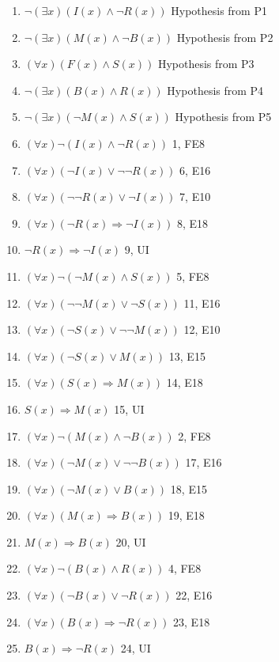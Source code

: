 \documentclass{article}
\begin{document}
		\begin{enumerate}
			\item $\lnot(\exists x)(I(x) \land \lnot R(x))$ \hfill Hypothesis from P1
			\item $\lnot(\exists x)(M(x) \land \lnot B(x))$ \hfill Hypothesis from P2
			\item $(\forall x)(F(x) \land S(x))$ \hfill Hypothesis from P3
			\item $\lnot(\exists x)(B(x) \land R(x))$ \hfill Hypothesis from P4
			\item $\lnot(\exists x)(\lnot M(x) \land S(x))$ \hfill Hypothesis from P5
			\item $(\forall x)\lnot(I(x) \land \lnot R(x))$ \hfill 1, FE8
			\item $(\forall x)(\lnot I(x) \lor \lnot\lnot R(x))$ \hfill 6, E16
			\item $(\forall x)(\lnot\lnot R(x) \lor \lnot I(x))$ \hfill 7, E10
			\item $(\forall x)(\lnot R(x) \Rightarrow \lnot I(x))$ \hfill 8, E18
			\item $\lnot R(x) \Rightarrow \lnot I(x)$ \hfill 9, UI
			\item $(\forall x)\lnot(\lnot M(x) \land S(x))$ \hfill 5, FE8
			\item $(\forall x)(\lnot\lnot M(x) \lor \lnot S(x))$ \hfill 11, E16
			\item $(\forall x)(\lnot S(x) \lor \lnot\lnot M(x))$ \hfill 12, E10
			\item $(\forall x)(\lnot S(x) \lor M(x))$ \hfill 13, E15
			\item $(\forall x)(S(x) \Rightarrow M(x))$ \hfill 14, E18
			\item $S(x) \Rightarrow M(x)$ \hfill 15, UI
			\item $(\forall x)\lnot(M(x) \land \lnot B(x))$ \hfill 2, FE8
			\item $(\forall x)(\lnot M(x) \lor \lnot\lnot B(x))$ \hfill 17, E16
			\item $(\forall x)(\lnot M(x) \lor B(x))$ \hfill 18, E15
			\item $(\forall x)(M(x) \Rightarrow B(x))$ \hfill 19, E18
			\item $M(x) \Rightarrow B(x)$ \hfill 20, UI
			\item $(\forall x)\lnot(B(x) \land R(x))$ \hfill 4, FE8
			\item $(\forall x)(\lnot B(x) \lor \lnot R(x))$ \hfill 22, E16
			\item $(\forall x)(B(x) \Rightarrow \lnot R(x))$ \hfill 23, E18
			\item $B(x) \Rightarrow \lnot R(x)$ \hfill 24, UI

\end{enumerate}
\end{document}
